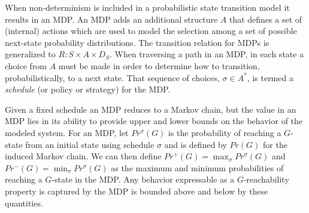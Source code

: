 When non-determinism is included in a probabilistic state
transition model it results in an MDP.  
An MDP adds an additional structure $A$ that defines
a set of (internal) actions which are used to model the
selection among a set of possible next-state probability distributions.
The transition relation
for MDPs is generalized to $R : S \times A \times D_S$.
When traversing a path in an MDP, in each state a choice
from $A$ must be made in order to determine how to transition,
probabilistically, to a next state.   That sequence of choices, 
$\sigma \in A^*$, is termed a \textit{schedule} (or policy or 
strategy) for the MDP.

Given a fixed schedule an MDP reduces to a Markov chain, but
the value in an MDP lies in its ability to provide upper and
lower bounds on the behavior of the modeled system.
For an MDP, let $Pr^{\sigma}(G)$ is the probability of reaching
a $G$-state from an initial state using schedule $\sigma$ and
is defined by $Pr(G)$ for the induced Markov chain.
We can then define 
$Pr^+(G) = \max_{\sigma} Pr^{\sigma}(G)$
and
$Pr^-(G) = \min_{\sigma} Pr^{\sigma}(G)$
as the maximum and minimum probabilities of reaching a $G$-state
in the MDP.  Any behavior expressable as a $G$-reachability property is
captured by the MDP is bounded above and
below by these quantities.



